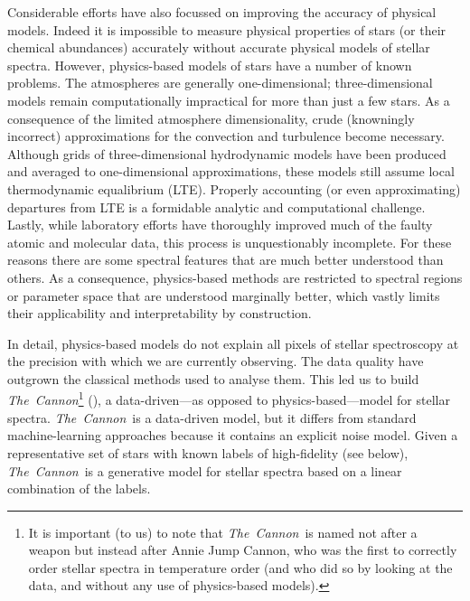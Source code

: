 \documentclass[12pt,preprint]{aastex}
\newcommand{\project}[1]{\textsl{#1}}
\newcommand{\TheCannon}{\project{The~Cannon}}
\begin{document}
Considerable efforts have also focussed on improving the accuracy of physical
models.  Indeed it is impossible to measure physical properties of stars (or 
their chemical abundances) accurately without accurate physical models of 
stellar spectra.  However, physics-based models of stars have a number of known
problems.  The atmospheres are generally one-dimensional; three-dimensional
models remain computationally impractical for more than just a few stars.  As a
consequence of the limited atmosphere dimensionality, crude (knowningly 
incorrect) approximations for the convection and turbulence become necessary. 
Although grids of three-dimensional hydrodynamic models have been produced 
and averaged to one-dimensional approximations, these models still assume local
thermodynamic equalibrium (LTE).  Properly accounting (or even approximating) 
departures from LTE is a formidable analytic and computational challenge.
Lastly, while laboratory efforts have thoroughly improved much of the faulty
atomic and molecular data, this process is unquestionably incomplete.  For these
reasons there are some spectral features that are much better understood than
others.  As a consequence, physics-based methods are restricted to spectral
regions or parameter space that are understood marginally better, which vastly
limits their applicability and interpretability by construction.



In detail, physics-based models do not explain all pixels of stellar 
spectroscopy at the precision with which we are currently observing.  The data
quality have outgrown the classical methods used to analyse them.  This led us 
to build \TheCannon\footnote{It is important (to us) to note that \TheCannon\ 
is named not after a weapon but instead after Annie Jump Cannon, who was the 
first to correctly order stellar spectra in temperature order (and who did so
by looking at the data, and without any use of physics-based models).} 
(\citealt{tc}), a data-driven---as opposed to physics-based---model for stellar
spectra.  \TheCannon\ is a data-driven model, but it differs from standard 
machine-learning approaches because it contains an explicit noise model. Given a
representative set of stars with known labels of high-fidelity (see below), 
\TheCannon\ is a generative model for stellar spectra based on a linear 
combination of the labels.
\end{document}
